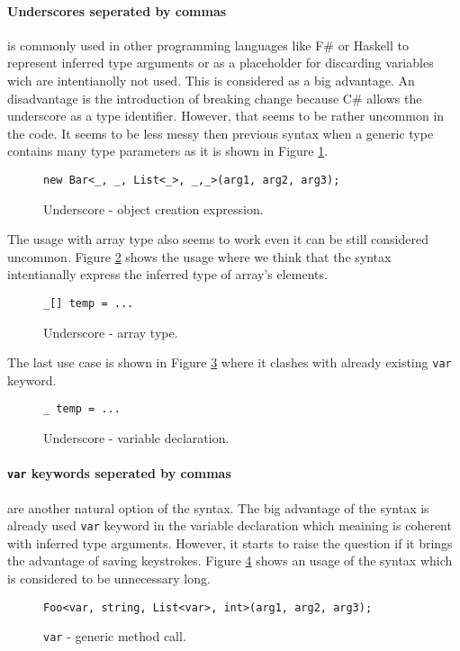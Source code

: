 \paragraph*{Underscores seperated by commas} is commonly used in other programming languages like F\# or Haskell to represent inferred type arguments or as a placeholder for discarding variables wich are intentianolly not used.
This is considered as a big advantage.
An disadvantage is the introduction of breaking change because C\# allows the underscore as a type identifier.
However, that seems to be rather uncommon in the code. 
It seems to be less messy then previous syntax when a generic type contains many type parameters as it is shown in Figure \ref{img50:opU1}.
\begin{figure}[h!]
\begin{lstlisting}[style=csharp]
new Bar<_, _, List<_>, _,_>(arg1, arg2, arg3);
\end{lstlisting}
\caption{Underscore - object creation expression.}
\label{img50:opU1}
\end{figure}
\par
The usage with array type also seems to work even it can be still considered uncommon.
Figure \ref{img51:opU4} shows the usage where we think that the syntax intentianally express the inferred type of array's elements.
\begin{figure}[h!]
\begin{lstlisting}[style=csharp]
_[] temp = ...
\end{lstlisting}
\caption{Underscore - array type.}
\label{img51:opU4}
\end{figure}
\par
The last use case is shown in Figure \ref{img52:opU5} where it clashes with already existing \texttt{var} keyword.
\begin{figure}[h!]
\begin{lstlisting}[style=csharp]
_ temp = ...
\end{lstlisting}
\caption{Underscore - variable declaration.}
\label{img52:opU5}
\end{figure}

\paragraph*{\texttt{var} keywords seperated by commas} are another natural option of the syntax.
The big advantage of the syntax is already used \texttt{var} keyword in the variable declaration which meaining is coherent with inferred type arguments.
However, it starts to raise the question if it brings the advantage of saving keystrokes.
Figure \ref{img52:opV1} shows an usage of the syntax which is considered to be unnecessary long.
\begin{figure}[h]
\begin{lstlisting}[style=csharp]
Foo<var, string, List<var>, int>(arg1, arg2, arg3);
\end{lstlisting}
\caption{\texttt{var} - generic method call.}
\label{img52:opV1}
\end{figure}

